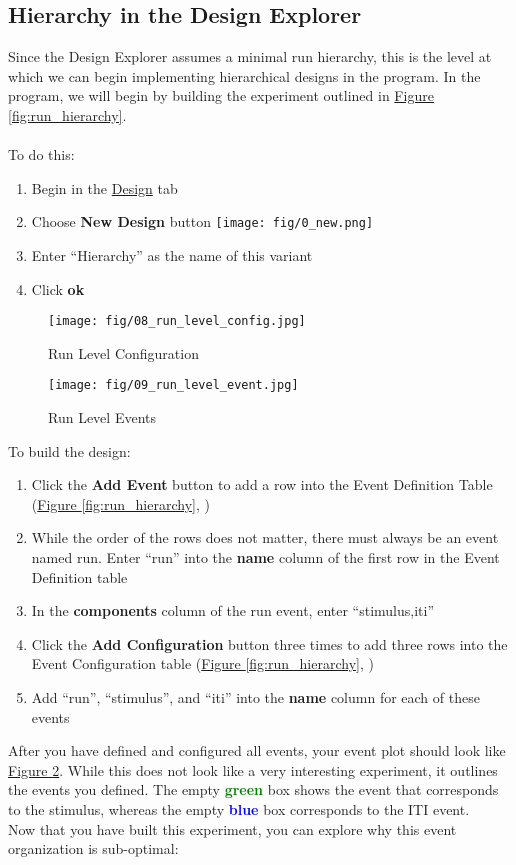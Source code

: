 \documentclass[10pt]{article}
\newcommand*\circled[1]{\tikz[baseline=(char.base)]{
            \node[shape=circle,draw,inner sep=.5pt] (char) {#1};}}
\newcommand*{\nbut}{\texttt{[image: fig/0\_new.png]}}
\begin{document}
	\subsection{Hierarchy in the Design Explorer}
	\label{subsec:u2hierDE}
		Since the Design Explorer assumes a minimal run hierarchy, this is the level at which we can begin implementing hierarchical designs in the program.
		In the program, we will begin by building the experiment outlined in \hyperref[fig:run_hierarchy]{Figure \ref{fig:run_hierarchy}}. \\ \\
		To do this:
		\begin{enumerate}
			\item Begin in the \hyperref[subsubsec:design]{Design} tab
			\item Choose \textbf{New Design} button \nbut{}
			\item Enter ``Hierarchy'' as the name of this variant
			\item Click \textbf{ok}
		\end{enumerate}
		\begin{figure}[ht]
			\centering
			\texttt{[image: fig/08\_run\_level\_config.jpg]}
			\caption{Run Level Configuration}
			\label{fig:run_hierarchy_config}
		\end{figure}
		\begin{figure}[ht]
			\centering
			\texttt{[image: fig/09\_run\_level\_event.jpg]}
			\caption{Run Level Events}
			\label{fig:run_hierarchy_events}
		\end{figure}
		To build the design:
		\begin{enumerate}
			\item Click the \textbf{Add Event} button to add a row into the Event Definition Table (\hyperref[fig:run_hierarchy]{Figure \ref{fig:run_hierarchy}}, \circled{1})
			\item While the order of the rows does not matter, there must always be an event named run. Enter ``run'' into the \textbf{name} column of the first row in the Event Definition table
			\item In the \textbf{components} column of the run event, enter ``stimulus,iti''
			\item Click the \textbf{Add Configuration} button three times to add three rows into the Event Configuration table (\hyperref[fig:run_hierarchy]{Figure \ref{fig:run_hierarchy}}, \circled{2})
			\item Add ``run'', ``stimulus'', and ``iti'' into the \textbf{name} column for each of these events
		\end{enumerate}
		After you have defined and configured all events, your event plot should look like \hyperref[fig:run_hierarchy]{Figure \ref{fig:run_hierarchy_events}}.
		While this does not look like a very interesting experiment, it outlines the events you defined.
		The empty \textcolor{green}{\textbf{green}} box shows the event that corresponds to the stimulus, whereas the empty \textcolor{blue}{\textbf{blue}} box corresponds to the ITI event. \\
		Now that you have built this experiment, you can explore why this event organization is sub-optimal:
\end{document}

